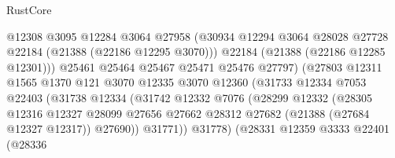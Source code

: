 \begin{lexlean}{RustCore}
\begin{coremodule}
                                    @12308
                                    @3095
                                    @12284
                                    @3064
                                    @27958
                                    (@30934
                                      @12294
                                      @3064
                                      @28028
                                      @27728
                                      @22184
                                      (@21388 (@22186 @12295 @3070)))
                                    @22184
                                    (@21388 (@22186 @12285 @12301)))
                                  @25461
                                  @25464
                                  @25467
                                  @25471
                                  @25476
                                  @27797)
                                (@27803
                                  @12311
                                  @1565
                                  @1370
                                  @121
                                  @3070
                                  @12335
                                  @3070
                                  @12360
                                  (@31733
                                    @12334
                                    @7053
                                    @22403
                                    (@31738
                                      @12334
                                      (@31742
                                        @12332
                                        @7076
                                        (@28299
                                          @12332
                                          (@28305
                                            @12316
                                            @12327
                                            @28099
                                            @27656
                                            @27662
                                            @28312
                                            @27682
                                            (@21388 (@27684 @12327 @12317))
                                            @27690))
                                        @31771))
                                    @31778)
                                  (@28331
                                    @12359
                                    @3333
                                    @22401
                                    (@28336

\end{coremodule}
\end{lexlean}
